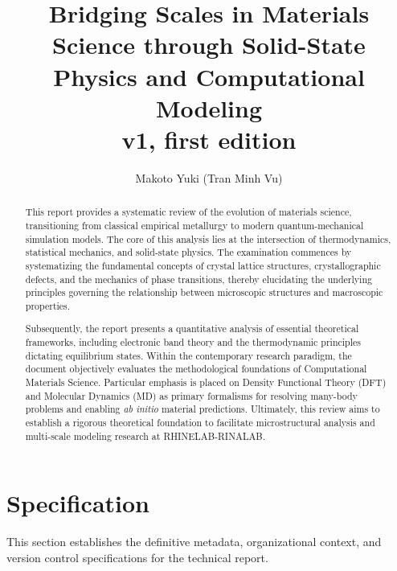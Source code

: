 \documentclass[10pt,a4paper]{article}
\title{\textbf{Bridging Scales in Materials Science through Solid-State Physics and Computational Modeling}\\ v1, first edition}
\author{Makoto Yuki (Tran Minh Vu)} %
\affiliation{} %
\begin{document}
\maketitle

\begin{abstract}
    \noindent
    This report provides a systematic review of the evolution of materials science, transitioning from classical empirical metallurgy to modern quantum-mechanical simulation models. The core of this analysis lies at the intersection of thermodynamics, statistical mechanics, and solid-state physics. The examination commences by systematizing the fundamental concepts of crystal lattice structures, crystallographic defects, and the mechanics of phase transitions, thereby elucidating the underlying principles governing the relationship between microscopic structures and macroscopic properties. 

    Subsequently, the report presents a quantitative analysis of essential theoretical frameworks, including electronic band theory and the thermodynamic principles dictating equilibrium states. Within the contemporary research paradigm, the document objectively evaluates the methodological foundations of Computational Materials Science. Particular emphasis is placed on Density Functional Theory (DFT) and Molecular Dynamics (MD) as primary formalisms for resolving many-body problems and enabling \textit{ab initio} material predictions. Ultimately, this review aims to establish a rigorous theoretical foundation to facilitate microstructural analysis and multi-scale modeling research at RHINELAB-RINALAB.

\end{abstract}

\vspace{2.5cm}

\thispagestyle{firstpage}
\pagebreak


\newgeometry{} %

\section{Specification}
\label{sec:spec}

This section establishes the definitive metadata, organizational context, and version control specifications for the technical report.
\end{document}

